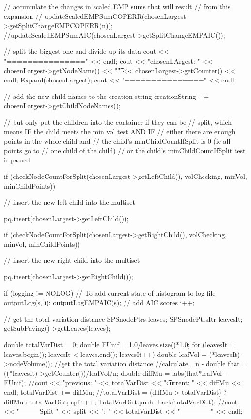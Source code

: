 \begin{DoxyCode}
{{{            // accumulate the changes in scaled EMP sums that will result
            // from this expansion
            //
      updateScaledEMPSumCOPERR(chosenLargest->getSplitChangeEMPCOPERR(n));
            //updateScaledEMPSumAIC(chosenLargest->getSplitChangeEMPAIC());

            // split the biggest one and divide up its data
           cout << "===============" << endl;
           cout << "chosenLArgest: " << chosenLargest->getNodeName() << "\t" <<
       chosenLargest->getCounter() << endl;
           Expand(chosenLargest);
           cout << "===============" << endl;
           
            // add the new child names to the creation string
            creationString += chosenLargest->getChildNodeNames();

            // but only put the children into the container if they can be
            // split, which means IF the child meets the min vol test AND IF
            // either there are enough points in the whole child and
                // the child's minChildCountIfSplit is 0 (ie all points go to
                // one child of the child)
            // or the child's minChildCountIfSplit test is passed

            if (checkNodeCountForSplit(chosenLargest->getLeftChild(),
                    volChecking, minVol, minChildPoints)) {
                // insert the new left child into the multiset
                
                pq.insert(chosenLargest->getLeftChild());
            }

            if (checkNodeCountForSplit(chosenLargest->getRightChild(),
                    volChecking, minVol, minChildPoints)) {
                // insert the new right child into the multiset
               
                pq.insert(chosenLargest->getRightChild());
            }

            if (logging != NOLOG) {
                // To add current state of histogram to log file
                outputLog(s, i);
                outputLogEMPAIC(s); // add AIC scores
                i++;
            }


        // get the total variation distance
        SPSnodePtrs leaves;
        SPSnodePtrsItr leavesIt;
        getSubPaving()->getLeaves(leaves);

        double totalVarDist = 0;
        double FUnif = 1.0/leaves.size()*1.0;
        for (leavesIt = leaves.begin(); leavesIt < leaves.end(); leavesIt++) {
          double leafVol = (*leavesIt)->nodeVolume();
          //get the total variation distance
          //calculate \mu_n - \mu
               double fhat = ((*leavesIt)->getCounter())/leafVol/n;
               double diffMu = fabs(fhat*leafVol - FUnif);
               //cout << "previous: " << totalVarDist << "\t current: " <<
       diffMu << endl;
          totalVarDist += diffMu;
          //totalVarDist = (diffMu > totalVarDist) ? diffMu : totalVarDist; 
        }
        split++;
        TotalVarDist.push_back(totalVarDist);
        //cout << "---------Split " << split << ": " << totalVarDist <<
       "--------------" << endl;

}}}
\end{DoxyCode}
